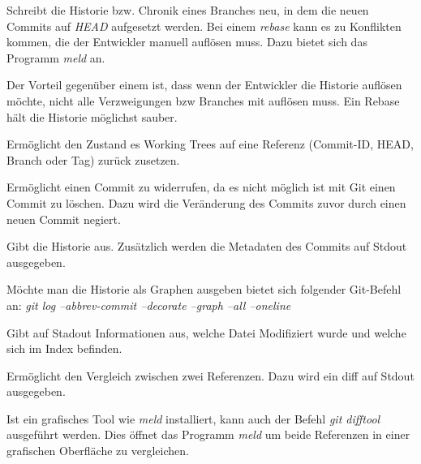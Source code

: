 \label{git-commands.advanced.rebase}
Schreibt die Historie bzw. Chronik eines Branches neu, in dem die neuen Commits auf \textit{HEAD} aufgesetzt werden. Bei einem \textit{rebase} kann es zu Konflikten kommen, die der Entwickler manuell auflösen muss. Dazu bietet sich das Programm \textit{meld} an. 

Der Vorteil gegenüber einem \textit{} ist, dass wenn der Entwickler die Historie auflösen möchte, nicht alle Verzweigungen bzw Branches mit auflösen muss. Ein Rebase hält die Historie möglichst sauber.

\label{git-commands.advanced.reset}
Ermöglicht den Zustand es Working Trees auf eine Referenz (Commit-ID, HEAD, Branch oder Tag) zurück zusetzen.

\label{git-commands.advanced.revert}
Ermöglicht einen Commit zu widerrufen, da es nicht möglich ist mit Git einen Commit zu löschen. Dazu wird die Veränderung des Commits zuvor durch einen neuen Commit negiert.

\label{git-commands.advanced.log}
Gibt die Historie aus. Zusätzlich werden die Metadaten des Commits auf Stdout ausgegeben. 

\begin{INFO}
  Möchte man die Historie als Graphen ausgeben bietet sich folgender Git-Befehl an: \textit{git log --abbrev-commit --decorate --graph --all --oneline}
\end{INFO}

\label{git-commands.advanced.status}
Gibt auf Stadout Informationen aus, welche Datei Modifiziert wurde und welche sich im Index befinden.

\label{git-commands.advanced.diff}
Ermöglicht den Vergleich zwischen zwei Referenzen. Dazu wird ein diff auf Stdout ausgegeben.

\begin{INFO}
  Ist ein grafisches Tool wie \textit{meld} installiert, kann auch der Befehl \textit{git difftool} ausgeführt werden. Dies öffnet das Programm \textit{meld} um beide Referenzen in einer grafischen Oberfläche zu vergleichen.
\end{INFO}